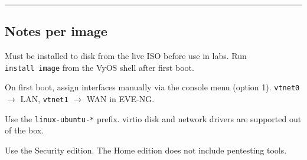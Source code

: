 \begin{center}\rule{0.5\linewidth}{0.5pt}\end{center}

\subsection{Notes per image}

\begin{description}
\tightlist
\item[\textbf{VyOS (rolling)}]
Must be installed to disk from the live ISO before use in labs. Run \texttt{install\ image} from the VyOS shell after first boot.
\item[\textbf{pfSense CE}]
On first boot, assign interfaces manually via the console menu (option 1). \texttt{vtnet0} $\rightarrow$ LAN, \texttt{vtnet1} $\rightarrow$ WAN in EVE-NG.
\item[\textbf{Ubuntu Server / Desktop}]
Use the \texttt{linux-ubuntu-*} prefix. virtio disk and network drivers are supported out of the box.
\item[\textbf{Parrot OS}]
Use the Security edition. The Home edition does not include pentesting tools.
\end{description}
